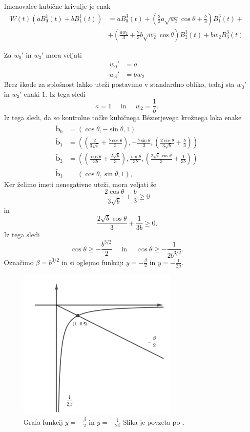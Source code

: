 \documentclass[a4paper,11pt]{article}
\theoremstyle{definition}
\theoremstyle{plain}
\begin{document}
Imenovalec kubične krivulje je enak
\begin{align*}
W(t)(aB_0^1(t)+bB_1^1(t)) &= aB_0^3(t)+\left ( \frac{2}{3}a\sqrt{w_2}\cos \theta +\frac{b}{3} \right )B_1^3(t)+ \\
&+ \left ( \frac{aw_2}{3} + \frac{2}{3}b\sqrt{w_2}\cos \theta  \right )B_2^3(t) + bw_2B_3^3(t)
\end{align*}

Za $w_0'$ in $w_3'$ mora veljati
\begin{align*}
w_0'&=a \\
w_3'&=bw_2
\end{align*}
Brez škode za splošnost lahko uteži postavimo v standardno obliko, tedaj sta $w_0'$ in $w_3'$ enaki $1$. Iz tega sledi
$$ a=1 \quad \text{ in } \quad w_2=\frac{1}{b}.$$
Iz tega sledi, da so kontrolne točke kubičnega B\'ezierjevega krožnega loka enake
\begin{align*}
\boldsymbol{\tilde{b}}_0 &= (\cos{\theta}, -\sin{\theta}, 1)\\
\boldsymbol{\tilde{b}}_1 &= \left ( \left (\frac{2}{3\sqrt{b}}+\frac{b\cos \theta}{3}\right ),-\frac{b \sin \theta}{3},\left (\frac{2\cos \theta}{3\sqrt{b}}+\frac{b}{3}\right )\right )\\
\boldsymbol{\tilde{b}}_2 &= \left ( \left (\frac{\cos \theta}{3b}+\frac{2\sqrt{b}}{3}\right ),\frac{\sin \theta}{3b},\left (\frac{2\sqrt{b}\cos \theta}{3}+\frac{1}{3b}\right )\right )\\
\boldsymbol{\tilde{b}}_3 &= (\cos \theta, \sin\theta, 1),
\end{align*}
Ker želimo imeti nenegativne uteži, mora veljati še
$$\frac{2\cos \theta}{3\sqrt{b}}+\frac{b}{3}\geq0$$
in
$$\frac{2\sqrt{b}\cos \theta}{3}+\frac{1}{3b}\geq0.$$
Iz tega sledi
$$\cos \theta \geq -\frac{b^{3/2}}{2}\quad\text{ in }\quad \cos  \theta \geq -\frac{1}{2b^{3/2}}.$$
Označimo $\beta=b^{3/2}$ in si oglejmo funkciji $y=-\frac{\beta}{2}$ in $y=-\frac{1}{2\beta}$.\\
\begin{figure}[ht!]
    \centering
    \includegraphics[width=80mm]{graf.png}
    \caption{Grafa funkcij $y=-\frac{\beta}{2}$ in $y=-\frac{1}{2\beta}$ Slika je povzeta po \cite{chou}.}
    \label{slika:graf}
\end{figure}
\end{document}
